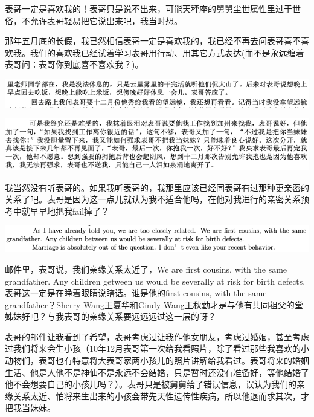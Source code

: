 \documentclass[9pt, b5paper]{article}
\begin{document}
表哥一定是喜欢我的！表哥只是说不出来，可能天秤座的舅舅尘世属性里过于世俗，不允许表哥轻易把它说出来吧，我当时想。

那年五月底的长假，我已然相信表哥一定是喜欢我的，我已经不再去问表哥喜不喜欢我。我们的喜欢我已经试着学习表哥用行动、用其它方式表达(而不是永远缠着表哥问：表哥你到底喜不喜欢我？)。

\begin{center}
\includegraphics[width=.9\linewidth]{./pic/p1p57-3.png}
\end{center}

\begin{center}
\includegraphics[width=.9\linewidth]{./pic/p1p58-2.png}
\end{center}

我当然没有听表哥的。如果我听表哥的，我那里应该已经同表哥有过那种更亲密的关系了吧。表哥是因为这一点儿就认为我不适合他吗，在他对我进行的亲密关系预考中就早早地把我fail掉了？

\begin{center}
\includegraphics[width=.9\linewidth]{./pic/p1p63-4.png}
\end{center}

邮件里，表哥说，我们亲缘关系太近了，We are first cousins, with the same grandfather. Any children getween us would be severally at risk for birth defects.表哥这一定是在睁着眼睛说瞎话。谁是他的first cousins, with the same grandfather？Sherry Wang王夏华和Cindy Wang王秋勤才是与他有共同祖父的堂姊妹好吧？与我表哥的亲缘关系要远远远过这一层的呀？

表哥的邮件让我看到了希望，表哥考虑过让我作他女朋友，考虑过婚姻，甚至考虑过我们将来会生小孩（10年12月表哥第一次给我看照片，除了看过那些我喜欢的小动物们，表哥也有特意将大表哥家两小孩儿的照片讲解给我看过。表哥将来的婚姻生活、他是人他不是神仙不是永远不会结婚，只是暂时还没有准备好，等他结婚了他不会想要自己的小孩儿吗？）。表哥只是被舅舅给了错误信息，误认为我们的亲缘关系太近、怕将来生出来的小孩会带先天性遗传性疾病，所以他退而求其次，才把我当妹妹。
\end{document}
